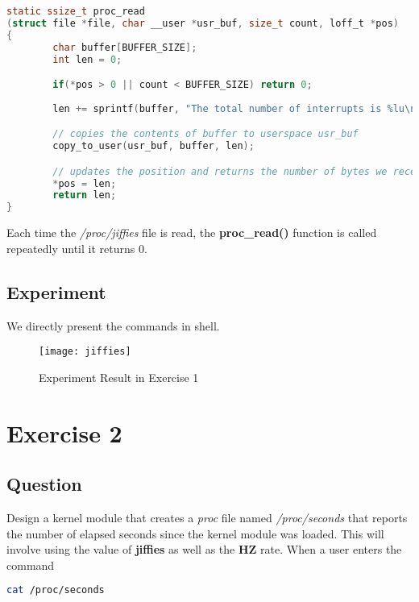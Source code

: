 \documentclass{article}
\begin{document}
    \begin{lstlisting}[language=c, caption={\textbf{proc\_read()}}]
static ssize_t proc_read
(struct file *file, char __user *usr_buf, size_t count, loff_t *pos)
{
        char buffer[BUFFER_SIZE];
        int len = 0;

        if(*pos > 0 || count < BUFFER_SIZE) return 0;
            
        len += sprintf(buffer, "The total number of interrupts is %lu\n", jiffies);

        // copies the contents of buffer to userspace usr_buf
        copy_to_user(usr_buf, buffer, len);

        // updates the position and returns the number of bytes we received
        *pos = len;
        return len;
}
    \end{lstlisting}

    \vspace{2pt}

    Each time the \textit{/proc/jiffies} file is read, the \textbf{proc\_read()} function is called repeatedly until it returns 0.

    \subsection*{Experiment}
    We directly present the commands in shell.

    \begin{figure}[h]
        \centering
        
        \texttt{[image: jiffies]}
        \caption{Experiment Result in Exercise 1}
        \label{}
    \end{figure}

    \section*{Exercise 2}
    \subsection*{Question}
    Design a kernel module that creates a \textit{proc} file named \textit{/proc/seconds}
    that reports the number of elapsed seconds since the kernel module was loaded. This will involve using the value of \textbf{jiffies} as well as the \textbf{HZ}
    rate. When a user enters the command

    \begin{lstlisting}[language=bash]
cat /proc/seconds
    \end{lstlisting}
\end{document}
